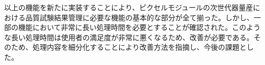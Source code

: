以上の機能を新たに実装することにより、ピクセルモジュールの次世代器量産における品質試験結果管理に必要な機能の基本的な部分が全て揃った。しかし、一部の機能において非常に長い処理時間を必要とすることが確認された。このような長い処理時間は使用者の満足度が非常に悪くなるため、改善が必要である。そのため、処理内容を細分化することにより改善方法を指摘し、今後の課題とした。


%
